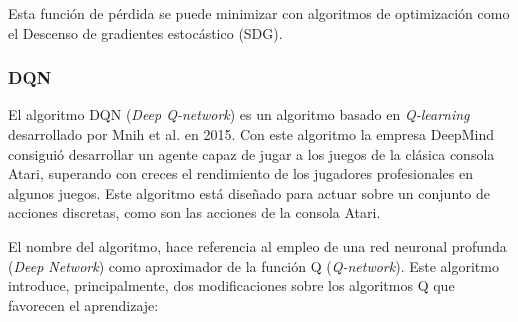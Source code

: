 Esta función de pérdida se puede minimizar con algoritmos de optimización como el Descenso de gradientes estocástico (SDG).

\subsubsection{DQN}

El algoritmo DQN (\textit{Deep Q-network}) es un algoritmo basado en \textit{Q-learning} desarrollado por Mnih et al. \cite{mnih2015human} en 2015. Con este algoritmo la empresa DeepMind consiguió desarrollar un agente capaz de jugar a los juegos de la clásica consola Atari, superando con creces el rendimiento de los jugadores profesionales en algunos juegos. Este algoritmo está diseñado para actuar sobre un conjunto de acciones discretas, como son las acciones de la consola Atari.

El nombre del algoritmo, hace referencia al empleo de una red neuronal profunda (\textit{Deep Network}) como aproximador de la función Q (\textit{Q-network}).
Este algoritmo introduce, principalmente, dos modificaciones sobre los algoritmos Q que favorecen el aprendizaje:


